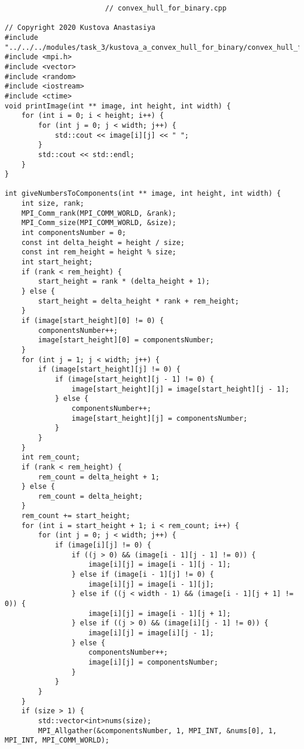 \documentclass{report}
\begin{document}
\begin{lstlisting}
						// convex_hull_for_binary.cpp

// Copyright 2020 Kustova Anastasiya
#include "../../../modules/task_3/kustova_a_convex_hull_for_binary/convex_hull_for_binary.h"
#include <mpi.h>
#include <vector>
#include <random>
#include <iostream>
#include <ctime>
void printImage(int ** image, int height, int width) {
    for (int i = 0; i < height; i++) {
        for (int j = 0; j < width; j++) {
            std::cout << image[i][j] << " ";
        }
        std::cout << std::endl;
    }
}

int giveNumbersToComponents(int ** image, int height, int width) {
    int size, rank;
    MPI_Comm_rank(MPI_COMM_WORLD, &rank);
    MPI_Comm_size(MPI_COMM_WORLD, &size);
    int componentsNumber = 0;
    const int delta_height = height / size;
    const int rem_height = height % size;
    int start_height;
    if (rank < rem_height) {
        start_height = rank * (delta_height + 1);
    } else {
        start_height = delta_height * rank + rem_height;
    }
    if (image[start_height][0] != 0) {
        componentsNumber++;
        image[start_height][0] = componentsNumber;
    }
    for (int j = 1; j < width; j++) {
        if (image[start_height][j] != 0) {
            if (image[start_height][j - 1] != 0) {
                image[start_height][j] = image[start_height][j - 1];
            } else {
                componentsNumber++;
                image[start_height][j] = componentsNumber;
            }
        }
    }
    int rem_count;
    if (rank < rem_height) {
        rem_count = delta_height + 1;
    } else {
        rem_count = delta_height;
    }
    rem_count += start_height;
    for (int i = start_height + 1; i < rem_count; i++) {
        for (int j = 0; j < width; j++) {
            if (image[i][j] != 0) {
                if ((j > 0) && (image[i - 1][j - 1] != 0)) {
                    image[i][j] = image[i - 1][j - 1];
                } else if (image[i - 1][j] != 0) {
                    image[i][j] = image[i - 1][j];
                } else if ((j < width - 1) && (image[i - 1][j + 1] != 0)) {
                    image[i][j] = image[i - 1][j + 1];
                } else if ((j > 0) && (image[i][j - 1] != 0)) {
                    image[i][j] = image[i][j - 1];
                } else {
                    componentsNumber++;
                    image[i][j] = componentsNumber;
                }
            }
        }
    }
    if (size > 1) {
        std::vector<int>nums(size);
        MPI_Allgather(&componentsNumber, 1, MPI_INT, &nums[0], 1, MPI_INT, MPI_COMM_WORLD);

\end{lstlisting}
\end{document}
